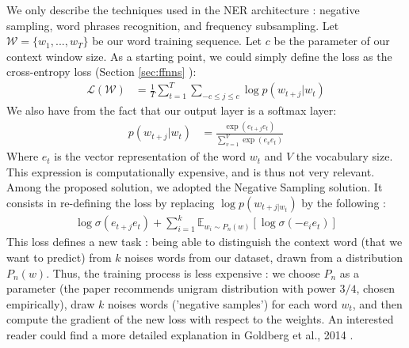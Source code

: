 \documentclass{article}
\begin{document}
We only describe the techniques used in the NER architecture : negative sampling, 
word phrases recognition, and frequency subsampling.
Let $\mathcal{W} = \{w_1, ..., w_T\}$ be our word training sequence. Let $c$ be the parameter of our
context window size. As a starting point, we could simply define the loss as the cross-entropy loss (Section \ref{sec:ffnns} ):
\begin{align*}
    \mathcal{L}(\mathcal{W}) &= \frac{1}{T} \sum_{t=1}^T \sum_{-c \leq j \leq c}
                               \log p(w_{t+j} | w_t)
\end{align*}
We also have from the fact that our output layer is a softmax layer: 
\begin{align*}
    p(w_{t+j} | w_t) &= \frac{\exp (e_{t+j} e_{t})}
    {\sum_{v=1}^V \exp (e_{v} e_{t})}
\end{align*}
Where $e_t$ is the vector representation of the word $w_t$ and $V$ the vocabulary size. This expression is computationally 
expensive, and is thus not very relevant. Among the proposed solution, we adopted the Negative 
Sampling solution. It consists in re-defining the loss by replacing $\log p(w_{t+j |w_t})$ by the
following :  
\begin{align*}
    \log \sigma(e_{t+j}e_t) + \sum_{i=1}^k \mathbb{E}_{w_i \sim P_n(w) }
        [\log \sigma(-e_i e_t)]
\end{align*}
This loss defines a new task : being able to distinguish the context word
(that we want to predict) from $k$ noises words from our dataset, drawn from a distribution $P_n(w)$. 
Thus, the training process is less expensive : we choose $P_n$ as a parameter (the paper
recommends unigram distribution with power $3/4$, chosen empirically), draw $k$ 
noises words ('negative samples') for each word $w_t$, and then compute the gradient of the
new loss with respect to the weights. An interested reader could find a more detailed
explanation in Goldberg et al., 2014 \cite{Goldberg2014Word2vecMethod}. \\ \par
\end{document}
